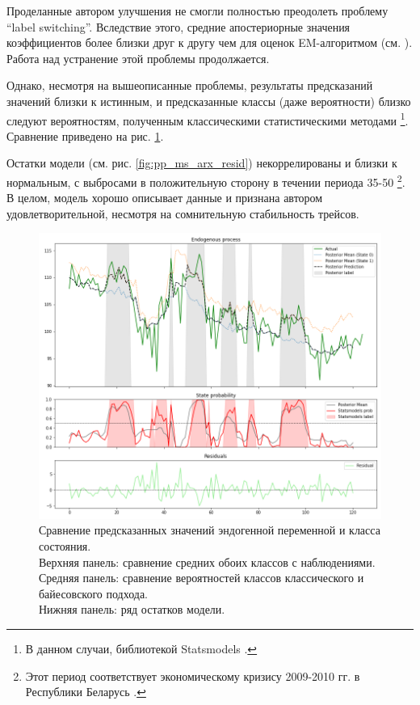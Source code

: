 \documentclass[a4paper,14pt]{extreport}
\begin{document}
Проделанные автором улучшения не смогли полностью преодолеть проблему ``label switching''. Вследствие этого, средние апостериорные значения коэффициентов более близки друг к другу чем для оценок EM-алгоритмом (см. ). Работа над устранение этой проблемы продолжается. 

Однако, несмотря на вышеописанные проблемы, результаты предсказаний значений близки к истинным, и предсказанные классы (даже вероятности) близко следуют вероятностям, полученным классическими статистическими методами \footnote{В данном случаи, библиотекой Statsmodels \cite{statsmodels}. }. Сравнение приведено на рис. \ref{fig:pp_ms_arx_fit}.

Остатки модели (см. рис. \ref{fig:pp_ms_arx_resid}) некоррелированы и близки к нормальным, с выбросами в положительную сторону в течении периода 35-50 \footnote{Этот период соответствует экономическому кризису 2009-2010 гг. в Республики Беларусь \cite{mak_mal_bv_2018}. }. В целом, модель хорошо описывает данные и признана автором удовлетворительной, несмотря на сомнительную стабильность трейсов.

\begin{figure}[H]
	\includegraphics[width=\linewidth]{img/gen/pp_ms_arx_fit.png}
	\caption{
		Сравнение предсказанных значений эндогенной переменной и класса состояния. \\
		Верхняя панель: сравнение средних обоих классов с наблюдениями. \\
		Средняя панель: сравнение вероятностей классов классического и байесовского подхода. \\
		Нижняя панель: ряд остатков модели.
	}
	\label{fig:pp_ms_arx_fit}
\end{figure}
\end{document}
